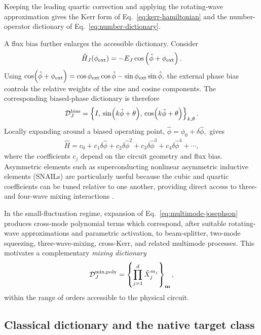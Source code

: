 \documentclass[pra,twocolumn,superscriptaddress,nofootinbib,floatfix]{revtex4-2}
\theoremstyle{remark}
\begin{document}
Keeping the leading quartic correction and applying the rotating-wave approximation gives the Kerr form of Eq.~\eqref{eq:kerr-hamiltonian} and the number-operator dictionary of Eq.~\eqref{eq:number-dictionary}.

A flux bias further enlarges the accessible dictionary. Consider
\begin{align}
\hat H_J(\phi_{\rm ext})=-E_J\cos\left(\hat\phi+\phi_{\rm ext}\right).
\end{align}
Using
$\cos(\hat\phi+\phi_{\rm ext})=\cos\phi_{\rm ext}\cos\hat\phi-\sin\phi_{\rm ext}\sin\hat\phi,$
the external phase bias controls the relative weights of the sine and cosine components. The corresponding biased-phase dictionary is therefore
\begin{align}
\mathcal D_{J}^{\rm bias}=\left\{I,\,\sin(k\hat\phi+\theta),\,\cos(k\hat\phi+\theta)\right\}_{k,\theta}.
\label{eq:biased-dictionary}
\end{align}
Locally expanding around a biased operating point,
$\hat\phi=\phi_0+\delta\hat\phi,$
gives
\begin{align}
\hat H=c_0+c_1\delta\hat\phi+c_2\delta\hat\phi^2+c_3\delta\hat\phi^3+c_4\delta\hat\phi^4+\cdots,
\end{align}
where the coefficients \(c_j\) depend on the circuit geometry and flux bias. Asymmetric elements such as superconducting nonlinear asymmetric inductive elements (SNAILs) are particularly useful because the cubic and quartic coefficients can be tuned relative to one another, providing direct access to three- and four-wave mixing interactions \cite{Frattini_2017,Sivak2019Kerrfree}.

In the small-fluctuation regime, expansion of Eq.~\eqref{eq:multimode-josephson} produces cross-mode polynomial terms which correspond, after suitable rotating-wave approximations and parametric activation, to beam-splitter, two-mode squeezing, three-wave-mixing, cross-Kerr, and related multimode processes. This motivates a complementary \emph{mixing dictionary}
\begin{align}
\mathcal D_{J}^{\rm mix,poly}=\left\{\prod_{j=1}^{d}\hat X_j^{m_j}\right\}_{\mathbf m},
\label{eq:multimode-polynomial-dictionary}
\end{align}
within the range of orders accessible to the physical circuit.

\subsection{Classical dictionary and the native target class}
\end{document}
